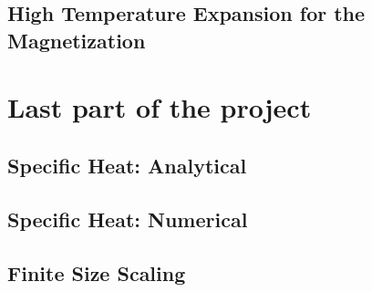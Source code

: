 \documentclass[a4paper,11pt]{article}
\begin{document}
    \subsection{High Temperature Expansion for the Magnetization}


\section{Last part of the project}

    \subsection{Specific Heat: Analytical}

    \subsection{Specific Heat: Numerical}

    \subsection{Finite Size Scaling}
\end{document}
